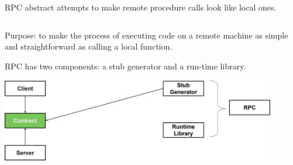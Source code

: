 \begin{slide}


    RPC abstract attempts to make remote procedure calls look like local ones.

\end{slide}

\begin{slide}


    \inputminted[fontsize=\scriptsize]{c}{wmsg.c}

\end{slide}

\begin{slide}


    Purpose: to make the process of executing code on a remote machine as simple and straightforward as calling a local function.
    \bigskip

    RPC has two components: a stub generator and a run-time library.
    \bigskip

    \includegraphics[width=120mm]{rpc.png}

\end{slide}

\begin{slide}


    \inputminted{python}{Adder.idl}

\end{slide}

\begin{slide}


    \inputminted{python}{server.py}
    \bigskip

    \inputminted{python}{client.py}

\end{slide}

